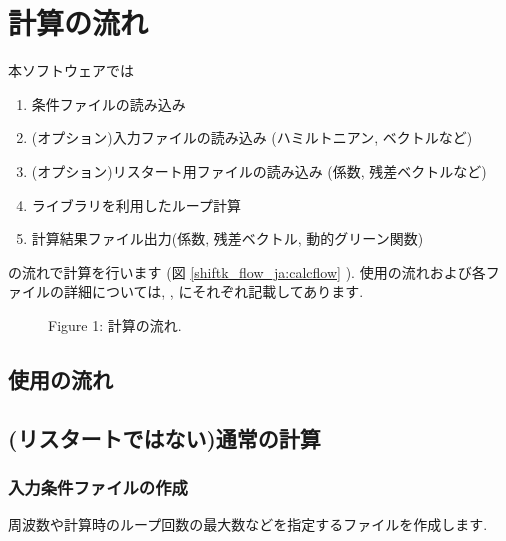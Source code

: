 \documentclass[letterpaper,10pt,dvipdfmx,openany]{sphinxmanual}
\begin{document}
\chapter{計算の流れ}
\label{\detokenize{shiftk_flow_ja:id1}}\label{\detokenize{shiftk_flow_ja::doc}}
本ソフトウェアでは
\begin{enumerate}
%
\item {} 
条件ファイルの読み込み

\item {} 
(オプション)入力ファイルの読み込み (ハミルトニアン, ベクトルなど)

\item {} 
(オプション)リスタート用ファイルの読み込み (係数, 残差ベクトルなど)

\item {} 
ライブラリを利用したループ計算

\item {} 
計算結果ファイル出力(係数, 残差ベクトル, 動的グリーン関数)

\end{enumerate}

の流れで計算を行います
(図 \ref{shiftk_flow_ja:calcflow} ).
使用の流れおよび各ファイルの詳細については, {\hyperref[\detokenize{shiftk_flow_ja:usage}]{}} ,
{\hyperref[\detokenize{shiftk_format_ja:fileformat}]{}} にそれぞれ記載してあります.

\begin{figure}[htbp]
\centering
\capstart

\noindent{}
\caption{Figure 1: 計算の流れ.}\label{\detokenize{shiftk_flow_ja:id16}}\label{\detokenize{shiftk_flow_ja:calcflow}}\end{figure}


\section{使用の流れ}
\label{\detokenize{shiftk_flow_ja:usage}}\label{\detokenize{shiftk_flow_ja:id2}}

\section{(リスタートではない)通常の計算}
\label{\detokenize{shiftk_flow_ja:id3}}

\subsection{入力条件ファイルの作成}
\label{\detokenize{shiftk_flow_ja:id4}}
周波数や計算時のループ回数の最大数などを指定するファイルを作成します.
\end{document}
